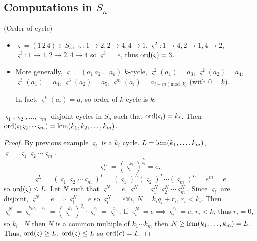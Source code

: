 \documentclass[10pt, a4paper]{article}
\begin{document}
\subsection{Computations in \texorpdfstring{$S_n$}{}}
\begin{example}
    (Order of cycle)
    \begin{itemize}
        \item $\varsigma = (1\,2\,4) \in S_{5}$,
        $\varsigma: 1 \to 2, 2 \to 4, 4 \to 1$,
        $\varsigma ^ 2: 1 \to 4, 2 \to 1, 4 \to 2$,
        $\varsigma ^ 3: 1 \to 1, 2 \to 2, 4 \to 4$ so $\varsigma ^ 3 = e$,
        thus $\operatorname{ord}(\varsigma) = 3$.

        \item More generally,
        $\varsigma = (a_1\, a_2\, \dotsc\, a_k)$ $k$-cycle,
        $\varsigma ^ 2(a_1) = a_3$,
        $\varsigma ^ 2(a_2) = a_4$,
        $\varsigma ^ 3(a_1) = a_4$,
        $\varsigma ^ 3(a_2) = a_5$,
        $\varsigma ^ m(a_i) = a_{i + m\pmod{k}}$
        (with $0 = k$).

        In fact,
        $\varsigma ^ k(a_i) = a_i$ so order of $k$-cycle is $k$.
    \end{itemize}
\end{example}

\begin{lemma}
    $\varsigma_1, \varsigma_2, \dotsc, \varsigma_m$ disjoint cycles in $S_n$ such that $\operatorname{ord}(\varsigma_i) = k_i$.
    Then $\operatorname{ord}(\varsigma_1\varsigma_2\dotsi\varsigma_m) = \operatorname{lcm}(k_1, k_2, \dotsc, k_m)$.

    \begin{proof}
        By previous example $\varsigma_i$ is a $k_i$ cycle.
        $L = \operatorname{lcm}(k_1, \dotsc, k_m)$,
        $\varsigma = \varsigma_1\varsigma_2\dotsi \varsigma_m$.
        \[
        \varsigma_{i}^{L} = \left(\varsigma_{i}^{k_i}\right)^{\frac{L}{k_i}} = e.
        \]
        \[
        \varsigma ^ L = (\varsigma_1\varsigma_2\dotsi\varsigma_m) ^ L = (\varsigma_1) ^ L(\varsigma_2) ^ L\dotsi(\varsigma_m) ^ L = e ^ m = e
        \]
        so $\operatorname{ord}(\varsigma) \leq L$.
        Let $N$ such that $\varsigma ^ N = e$,
        $\varsigma ^ N = \varsigma_1 ^ N\varsigma_2 ^ N\dotsi \varsigma_m ^ N$.
        Since $\varsigma_i$ are disjoint,
        $\varsigma ^ N = e \implies \varsigma_i ^ N = e$ so $\varsigma_i ^ N = e \forall i$,
        $N = k_iq_i + r_i$,
        $r_i < k_i$.
        Then $\varsigma_i ^ N = \varsigma_i ^ {k_iq_i + r_i} = (\varsigma_i ^ {k_i}) ^ {q_i}\cdot \varsigma_i^{r_i} = \varsigma_i ^ {r_i}$.
        If $\varsigma_i ^ N = e \implies \varsigma_i ^ {r_i} = e$,
        $r_i < k_i$ thus $r_i = 0$,
        so $k_i \mid N$ then $N$ is a common multiple of $k_1\dotsi k_m$ then $N \geq \operatorname{lcm}(k_1, \dotsc, k_m) = L$.
        Thus,
        $\operatorname{ord}(\varsigma) \geq L$,
        $\operatorname{ord}(\varsigma) \leq L$ so $\operatorname{ord}(\varsigma) = L$.
    \end{proof}
\end{lemma}
\end{document}
